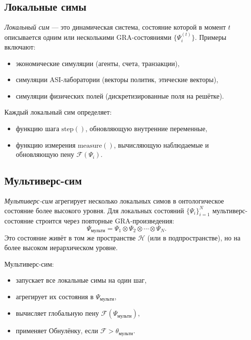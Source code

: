 \documentclass[11pt,a4paper]{article}
\begin{document}
\subsection{Локальные симы}
\emph{Локальный сим} --- это динамическая система,
состояние которой в момент $t$ описывается
одним или несколькими GRA-состояниями $\{\Psi_i^{(t)}\}$.
Примеры включают:
\begin{itemize}
  \item экономические симуляции (агенты, счета, транзакции),
  \item симуляции ASI-лаборатории (векторы политик, этические векторы),
  \item симуляции физических полей (дискретизированные поля на решётке).
\end{itemize}
Каждый локальный сим определяет:
\begin{itemize}
  \item функцию шага $\text{step}()$, обновляющую внутренние переменные,
  \item функцию измерения $\text{measure}()$, вычисляющую наблюдаемые
        и обновляющую пену $\mathcal{F}(\Psi_i)$.
\end{itemize}

\subsection{Мультиверс-сим}
\emph{Мультиверс-сим} агрегирует несколько локальных симов
в онтологическое состояние более высокого уровня.
Для локальных состояний $\{\Psi_i\}_{i=1}^N$
мультиверс-состояние строится через повторные GRA-произведения:
\begin{equation}
  \Psi_{\text{мульти}}
  = \Psi_1 \otimes \Psi_2 \otimes \cdots \otimes \Psi_N.
  \label{eq:multiverse-state}
\end{equation}
Это состояние живёт в том же пространстве $\mathcal{H}$
(или в подпространстве),
но на более высоком иерархическом уровне.

Мультиверс-сим:
\begin{itemize}
  \item запускает все локальные симы на один шаг,
  \item агрегирует их состояния в $\Psi_{\text{мульти}}$,
  \item вычисляет глобальную пену $\mathcal{F}(\Psi_{\text{мульти}})$,
  \item применяет Обнулёнку, если $\mathcal{F} > \theta_{\text{мульти}}$.
\end{itemize}
\end{document}
